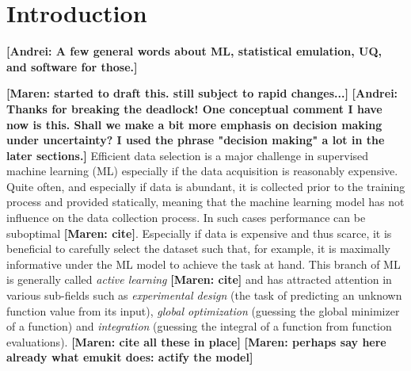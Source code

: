 
\newcommand{\maren}[1]{{\color{cyan} \textbf{[Maren: #1]}}}
\newcommand{\andrei}[1]{{\color{red} \textbf{[Andrei: #1]}}}
\newcommand{\rev}[1]{{\color{blue} \textbf{#1}}}

\section{Introduction}\label{introduction}

\andrei{A few general words about ML, statistical emulation, UQ, and software for those.}

\maren{started to draft this. still subject to rapid changes...}
\andrei{Thanks for breaking the deadlock! One conceptual comment I have now is this. Shall we make a bit more emphasis on decision making under uncertainty? I used the phrase "decision making" a lot in the later sections.}
Efficient data selection is a major challenge in supervised machine learning (ML) especially if the data acquisition is reasonably expensive. Quite often, and especially if data is abundant, it is collected prior to the training process and provided statically, meaning that the machine learning model has not influence on the data collection process. In such cases performance can be suboptimal \maren{cite}. Especially if data is expensive and thus scarce, it is beneficial to carefully select the dataset such that, for example, it is maximally informative under the ML model to achieve the task at hand. This branch of ML is generally called \emph{active learning} \maren{cite} and has attracted attention in various sub-fields such as \emph{experimental design} (the task of predicting an unknown function value from its input), \emph{global optimization} (guessing the global minimizer of a function) and \emph{integration} (guessing the integral of a function from function evaluations). \maren{cite all these in place}\maren{perhaps say here already what emukit does: actify the model}


